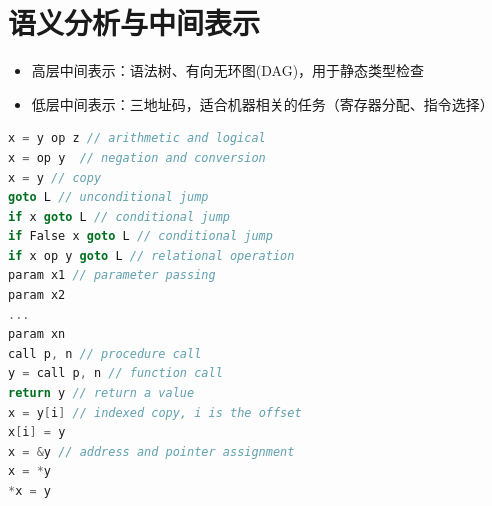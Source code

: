 
\section{语义分析与中间表示}
\begin{itemize}
\item 高层中间表示：语法树、有向无环图(DAG)，用于静态类型检查
\item 低层中间表示：三地址码，适合机器相关的任务（寄存器分配、指令选择）
\end{itemize}
\begin{lstlisting}[language=c++]
x = y op z // arithmetic and logical
x = op y  // negation and conversion
x = y // copy
goto L // unconditional jump
if x goto L // conditional jump 
if False x goto L // conditional jump
if x op y goto L // relational operation
param x1 // parameter passing
param x2
...
param xn
call p, n // procedure call
y = call p, n // function call
return y // return a value
x = y[i] // indexed copy, i is the offset
x[i] = y
x = &y // address and pointer assignment
x = *y
*x = y
\end{lstlisting}

